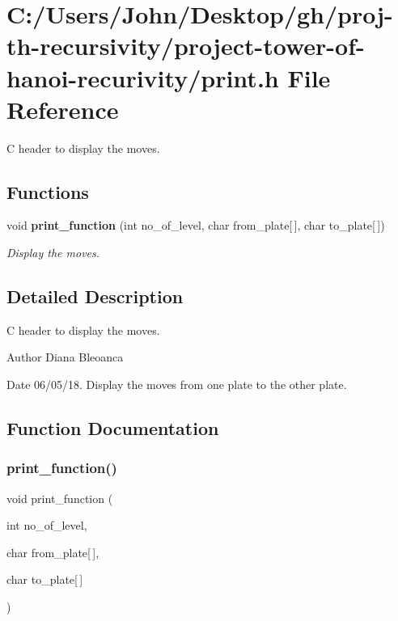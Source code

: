 \section{C\+:/\+Users/\+John/\+Desktop/gh/proj-\/th-\/recursivity/project-\/tower-\/of-\/hanoi-\/recurivity/print.h File Reference}
\label{print_8h}


C header to display the moves.  


\subsection*{Functions}
\begin{DoxyCompactItemize}
\item 
void \textbf{ print\+\_\+function} (int no\+\_\+of\+\_\+level, char from\+\_\+plate[$\,$], char to\+\_\+plate[$\,$])
\begin{DoxyCompactList}\small\item\em Display the moves. \end{DoxyCompactList}\end{DoxyCompactItemize}


\subsection{Detailed Description}
C header to display the moves. 

\begin{DoxyAuthor}{Author}
Diana Bleoanca 
\end{DoxyAuthor}
\begin{DoxyDate}{Date}
06/05/18. Display the moves from one plate to the other plate. 
\end{DoxyDate}


\subsection{Function Documentation}
\mbox{\label{print_8h_af0471cbf026592ba24b5adae3cdb02dc}} 
\subsubsection{print\+\_\+function()}
{\footnotesize\ttfamily void print\+\_\+function (\begin{DoxyParamCaption}\item[{int}]{no\+\_\+of\+\_\+level,  }\item[{char}]{from\+\_\+plate[$\,$],  }\item[{char}]{to\+\_\+plate[$\,$] }\end{DoxyParamCaption})}



